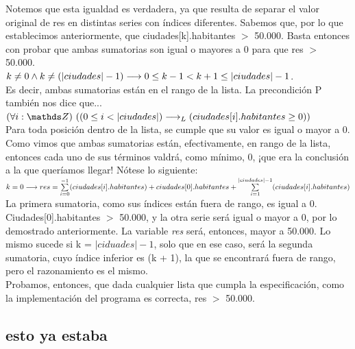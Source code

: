 \documentclass[10pt,a4paper]{article}
\begin{document}
Notemos que esta igualdad es verdadera, ya que resulta de separar el valor original de res en distintas series con índices diferentes. Sabemos que, por lo que establecimos anteriormente, que ciudades[k].habitantes $>$ 50.000. Basta entonces con probar que ambas sumatorias son igual o mayores a 0 para que res $>$ 50.000.\\

$k \neq 0 \wedge k \neq (|ciudades| - 1) \longrightarrow 0 \leq k - 1 < k + 1 \leq |ciudades| - 1$. \\

Es decir, ambas sumatorias están en el rango de la lista. La precondición P también nos dice que...\\

$\paraTodo[unalinea]{i}{\ent}{(0 \leq i < |ciudades|) \implicaLuego (ciudades[i].habitantes \geq 0)}$\\

Para toda posición dentro de la lista, se cumple que su valor es igual o mayor a 0. Como vimos que ambas sumatorias están, efectivamente, en rango de la lista, entonces cada uno de sus términos valdrá, como mínimo, 0, ¡que era la conclusión a la que queríamos llegar! Nótese lo siguiente:\\

$k = 0 \longrightarrow res = \sum\limits_{i=0}^{-1}(ciudades[i].habitantes) + ciudades[0].habitantes + \sum\limits_{i=1}^{|ciudades| - 1}(ciudades[i].habitantes)$ \\

La primera sumatoria, como sus índices están fuera de rango, es igual a 0. Ciudades[0].habitantes $>$ 50.000, y la otra serie será igual o mayor a 0, por lo demostrado anteriormente. La variable \textit{res} será, entonces, mayor a 50.000. Lo mismo sucede si k = $|ciduades| - 1$, solo que en ese caso, será la segunda sumatoria, cuyo índice inferior es (k + 1), la que se encontrará fuera de rango, pero el razonamiento es el mismo.\\

Probamos, entonces, que dada cualquier lista que cumpla la especificación, como la implementación del programa es correcta, res $>$ 50.000.

\newpage %



\subsection{esto ya estaba}
\end{document}
